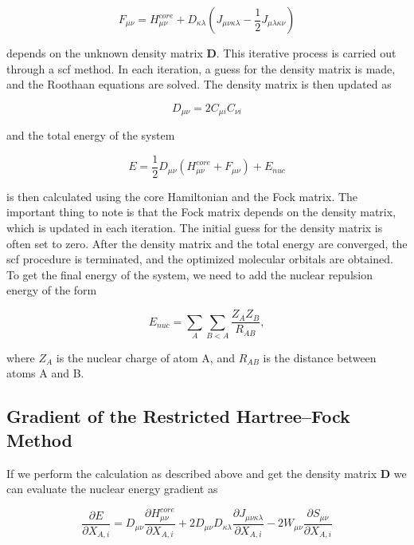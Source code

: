 \begin{equation}\label{eq:fock}
F_{\mu\nu}=H_{\mu\nu}^{core}+D_{\kappa\lambda}(J_{\mu\nu\kappa\lambda}-\frac{1}{2}J_{\mu\lambda\kappa\nu})
\end{equation}

depends on the unknown density matrix \(\mathbf{D}\). This iterative process is carried out through a \acrfull{scf} method. In each iteration, a guess for the density matrix is made, and the Roothaan equations are solved. The density matrix is then updated as

\begin{equation}
D_{\mu\nu}=2C_{\mu i}C_{\nu i}
\end{equation}

and the total energy of the system

\begin{equation}
E=\frac{1}{2}D_{\mu\nu}(H_{\mu\nu}^{core}+F_{\mu\nu})+E_{nuc}
\end{equation}

is then calculated using the core Hamiltonian and the Fock matrix. The important thing to note is that the Fock matrix depends on the density matrix, which is updated in each iteration. The initial guess for the density matrix is often set to zero. After the density matrix and the total energy are converged, the \acrshort{scf} procedure is terminated, and the optimized molecular orbitals are obtained. To get the final energy of the system, we need to add the nuclear repulsion energy of the form

\begin{equation}
E_{nuc}=\sum_{A}\sum_{B<A}\frac{Z_{A}Z_{B}}{R_{AB}},
\end{equation}

where \(Z_A\) is the nuclear charge of atom A, and \(R_{AB}\) is the distance between atoms A and B.

\subsection{Gradient of the Restricted Hartree--Fock Method}

If we perform the calculation as described above and get the density matrix \(\mathbf{D}\) we can evaluate the nuclear energy gradient as\cite{10.1002/9780470749593.hrs006}

\begin{equation}
\frac{\partial E}{\partial X_{A,i}}=D_{\mu\nu}\frac{\partial H_{\mu\nu}^{core}}{\partial X_{A,i}}+2D_{\mu\nu}D_{\kappa\lambda}\frac{\partial J_{\mu\nu\kappa\lambda}}{\partial X_{A,i}}-2W_{\mu\nu}\frac{\partial S_{\mu\nu}}{\partial X_{A,i}}
\end{equation}


